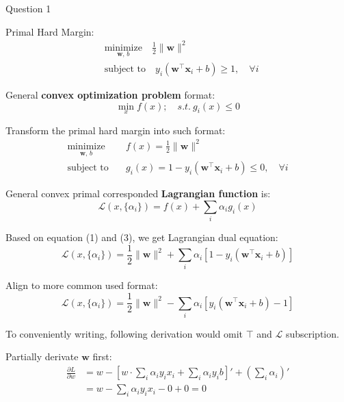 \documentclass[a4paper,12pt]{article}
\begin{document}
Question 1

Primal Hard Margin:
\begin{equation}
    \begin{aligned}
        &\underset{\mathbf{w},\,b}{\text{minimize}} \quad \frac{1}{2} \|\mathbf{w}\|^2 \\
        &\text{subject to} \quad y_i (\mathbf{w}^\top \mathbf{x}_i + b) \geq 1, \quad \forall i
    \end{aligned}
\end{equation}

General \textbf{convex optimization problem} format:
\begin{equation}
    \min_xf(x);\quad s.t. ~g_i(x)\leq 0
\end{equation}

Transform the primal hard margin into such format:
\begin{equation}
    \begin{aligned}
        \underset{\mathbf{w},\,b}{\text{minimize}} \quad &f(x) = \frac{1}{2} \|\mathbf{w}\|^2 \\
        \text{subject to} \quad &g_i(x) = 1 - y_i (\mathbf{w}^\top \mathbf{x}_i + b) \leq 0, \quad \forall i
    \end{aligned}
\end{equation}

General convex primal corresponded \textbf{Lagrangian function} is:
\begin{equation}
    \mathcal{L}(x, \{\alpha_i\}) = f(x) + \sum_i\alpha_ig_i(x)
\end{equation}

Based on equation (1) and (3), we get Lagrangian dual equation:
\begin{equation}
    \mathcal{L}(x, \{\alpha_i\}) = \frac{1}{2} \|\mathbf{w}\|^2 + \sum_i\alpha_i \left[1 - y_i (\mathbf{w}^\top \mathbf{x}_i + b)\right]
\end{equation}

Align to more common used format:
\begin{equation}
    \mathcal{L}(x, \{\alpha_i\}) = \frac{1}{2} \|\mathbf{w}\|^2 - \sum_i\alpha_i \left[y_i (\mathbf{w}^\top \mathbf{x}_i + b) - 1 \right]
\end{equation}

To conveniently writing, following derivation would omit $\top$ and $\mathcal{L}$ subscription.

Partially derivate $\textbf{w}$ first:
\begin{equation}
    \begin{aligned}
        \frac{\partial L}{\partial w} &= w - \left[w\cdot \sum_i\alpha_iy_ix_i + \sum_i\alpha_iy_ib \right]' + (\sum_i\alpha_i)' \\
        &= w - \sum_i\alpha_iy_ix_i - 0 + 0 = 0
    \end{aligned}
\end{equation}
\end{document}

